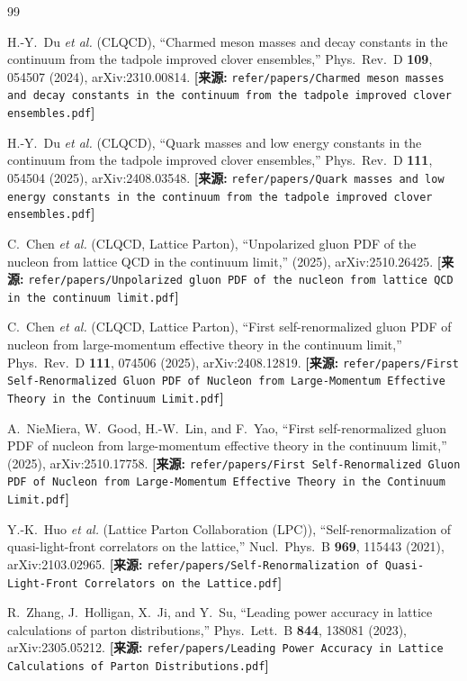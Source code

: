 \documentclass[12pt,a4paper]{ctexart}
\theoremstyle{definition}
\begin{document}
\begin{thebibliography}{99}

H.-Y.~Du \textit{et al.} (CLQCD),
``Charmed meson masses and decay constants in the continuum from the tadpole improved clover ensembles,''
Phys.\ Rev.\ D \textbf{109}, 054507 (2024), arXiv:2310.00814.
\quad\textbf{[来源:} \texttt{refer/papers/Charmed meson masses and decay constants in the continuum from the tadpole improved clover ensembles.pdf}\textbf{]}

H.-Y.~Du \textit{et al.} (CLQCD),
``Quark masses and low energy constants in the continuum from the tadpole improved clover ensembles,''
Phys.\ Rev.\ D \textbf{111}, 054504 (2025), arXiv:2408.03548.
\quad\textbf{[来源:} \texttt{refer/papers/Quark masses and low energy constants in the continuum from the tadpole improved clover ensembles.pdf}\textbf{]}

C.~Chen \textit{et al.} (CLQCD, Lattice Parton),
``Unpolarized gluon PDF of the nucleon from lattice QCD in the continuum limit,''
(2025), arXiv:2510.26425.
\quad\textbf{[来源:} \texttt{refer/papers/Unpolarized gluon PDF of the nucleon from lattice QCD in the continuum limit.pdf}\textbf{]}

C.~Chen \textit{et al.} (CLQCD, Lattice Parton),
``First self-renormalized gluon PDF of nucleon from large-momentum effective theory in the continuum limit,''
Phys.\ Rev.\ D \textbf{111}, 074506 (2025), arXiv:2408.12819.
\quad\textbf{[来源:} \texttt{refer/papers/First Self-Renormalized Gluon PDF of Nucleon from Large-Momentum Effective Theory in the Continuum Limit.pdf}\textbf{]}

A.~NieMiera, W.~Good, H.-W.~Lin, and F.~Yao,
``First self-renormalized gluon PDF of nucleon from large-momentum effective theory in the continuum limit,''
(2025), arXiv:2510.17758.
\quad\textbf{[来源:} \texttt{refer/papers/First Self-Renormalized Gluon PDF of Nucleon from Large-Momentum Effective Theory in the Continuum Limit.pdf}\textbf{]}

Y.-K.~Huo \textit{et al.} (Lattice Parton Collaboration (LPC)),
``Self-renormalization of quasi-light-front correlators on the lattice,''
Nucl.\ Phys.\ B \textbf{969}, 115443 (2021), arXiv:2103.02965.
\quad\textbf{[来源:} \texttt{refer/papers/Self-Renormalization of Quasi-Light-Front Correlators on the Lattice.pdf}\textbf{]}

R.~Zhang, J.~Holligan, X.~Ji, and Y.~Su,
``Leading power accuracy in lattice calculations of parton distributions,''
Phys.\ Lett.\ B \textbf{844}, 138081 (2023), arXiv:2305.05212.
\quad\textbf{[来源:} \texttt{refer/papers/Leading Power Accuracy in Lattice Calculations of Parton Distributions.pdf}\textbf{]}


\end{thebibliography}
\end{document}
